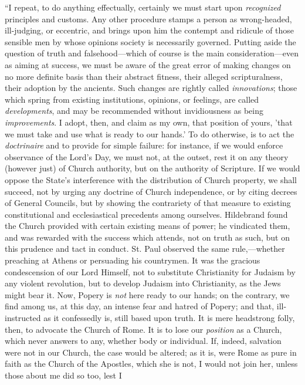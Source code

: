 ``I repeat, to do anything effectually, certainly
we must start upon \emph{recognized} principles and customs. Any other
procedure stamps a person as wrong-headed, ill-judging, or eccentric,
and brings upon him the contempt and ridicule of those sensible men by
whose opinions society is necessarily governed. Putting aside the
question of truth and falsehood—which of course is the main
consideration—even as aiming at success, we must be aware of the
great error of making changes on no more definite basis than their
abstract fitness, their alleged scripturalness, their adoption by the
ancients. Such changes are rightly called \emph{innovations}; those
which spring from existing institutions, opinions, or feelings, are
called \emph{developments}, and may be recommended without
invidiousness as being \emph{improvements}. I adopt, then, and claim as my
own, that position of yours, 'that we must take and use what is ready
to our hands.' To do otherwise, is to act the \emph{doctrinaire} and
to provide for simple failure: for instance, if we would enforce
observance of the Lord's Day, we must not, at the outset, rest it on
any theory (however just) of Church authority, but on the authority of
Scripture. If we would oppose the State's interference with the
distribution of Church property, we shall succeed, not by urging any
doctrine of Church independence, or by citing decrees of General
Councils, but by showing the contrariety of that measure to existing
constitutional and ecclesiastical precedents among ourselves.
Hildebrand found the Church provided with certain existing means of
power; he vindicated them, and was rewarded with the success which
attends, not on truth as such, but on this prudence and tact in
conduct. St. Paul observed the same rule,—whether preaching at
Athens or persuading his countrymen. It was the gracious condescension
of our Lord Himself, not to substitute Christianity for Judaism by any
violent revolution, but to develop Judaism into Christianity, as the
Jews might bear it. Now, Popery is \emph{not} here ready to our hands;
on the contrary, we find among us, at this day, an intense fear and
hatred of Popery; and that, ill-instructed as it confessedly is,
still based upon truth. It is mere headstrong folly, then, to advocate
the Church of Rome. It is to lose our \emph{position} as a Church,
which never answers to any, whether body or individual. If, indeed,
salvation were not in our Church, the case would be altered; as it is,
were Rome as pure in faith as the Church of the Apostles, which she is
not, I would not join her, unless those about me did so too, lest I
